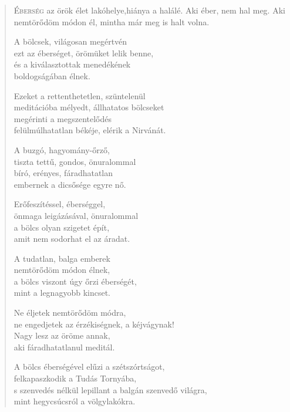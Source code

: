 
\begin{verse}

{\par%
\lettrine{É}{berség} {\LettrineTextFont az örök élet lakóhelye,}\newline hiánya a halálé.\newline
Aki éber, nem hal meg.\verselinebreak
Aki nemtörődöm módon él,\verselinebreak
mintha már meg is halt volna.
\par}

 A bölcsek, világosan megértvén\\
ezt az éberséget, örömüket lelik benne,\\
és a kiválasztottak menedékének\\
boldogságában élnek.

 Ezeket a rettenthetetlen, szüntelenül\\
meditációba mélyedt, állhatatos bölcseket\\
megérinti a megszentelődés\\
felülmúlhatatlan békéje, elérik a Nirvánát.

 A buzgó, hagyomány-őrző,\\
tiszta tettű, gondos, önuralommal\\
bíró, erényes, fáradhatatlan\\
embernek a dicsősége egyre nő.

 Erőfeszítéssel, éberséggel,\\
önmaga leigázásával, önuralommal\\
a bölcs olyan szigetet épít,\\
amit nem sodorhat el az áradat.

 A tudatlan, balga emberek\\
nemtörődöm módon élnek,\\
a bölcs viszont úgy őrzi éberségét,\\
mint a legnagyobb kincset.

 Ne éljetek nemtörődöm módra,\\
ne engedjetek az érzékiségnek, a kéjvágynak!\\
Nagy lesz az öröme annak,\\
aki fáradhatatlanul meditál.

 A bölcs éberségével elűzi a szétszórtságot,\\
felkapaszkodik a Tudás Tornyába,\\
s szenvedés nélkül lepillant a balgán szenvedő világra,\\
mint hegycsúcsról a völgylakókra.


\end{verse}
